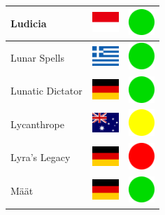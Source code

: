 \documentclass[12pt, a4paper, twoside]{report}
\begin{document}
\begin{center}
\begin{longtable}{|p{5cm}|p{2cm}|p{2cm}|}
 Ludicia                                                    & \includegraphics[width=1cm]{../4x3/id} &   \includegraphics[width=1cm]{../likes/y} \\ \hline
 Lunar Spells                                               & \includegraphics[width=1cm]{../4x3/gr} &   \includegraphics[width=1cm]{../likes/y} \\ \hline
 Lunatic Dictator                                           & \includegraphics[width=1cm]{../4x3/de} &   \includegraphics[width=1cm]{../likes/y} \\ \hline
 Lycanthrope                                                & \includegraphics[width=1cm]{../4x3/au} &   \includegraphics[width=1cm]{../likes/m} \\ \hline
 Lyra's Legacy                                              & \includegraphics[width=1cm]{../4x3/de} &   \includegraphics[width=1cm]{../likes/n} \\ \hline
 Määt                                                       & \includegraphics[width=1cm]{../4x3/de} &   \includegraphics[width=1cm]{../likes/y} \\ \hline

\end{longtable}
\end{center}
\end{document}
